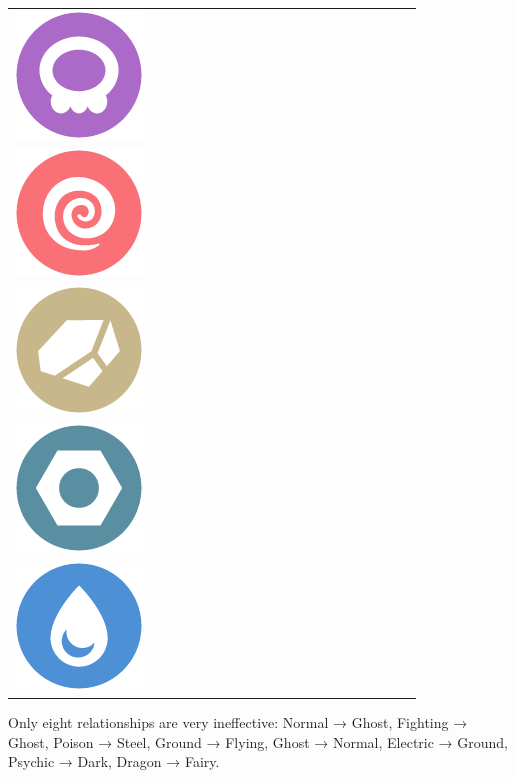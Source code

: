 \begin{table}[h]
\begin{tabular}{c c c c c c c c c c c c c c c c c c c c}
    \includegraphics[scale=.1]{images/poison.png} \\
    \includegraphics[scale=.1]{images/psychic.png} \\
    \includegraphics[scale=.1]{images/rock.png} \\
    \includegraphics[scale=.1]{images/steel.png} \\
    \includegraphics[scale=.1]{images/water.png} \\
\end{tabular}
\end{table}

Only eight relationships are very ineffective:
Normal → Ghost,
Fighting → Ghost,
Poison → Steel,
Ground → Flying,
Ghost → Normal,
Electric → Ground,
Psychic → Dark,
Dragon → Fairy.

